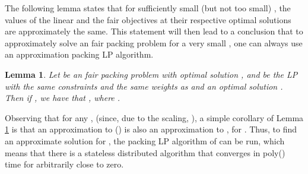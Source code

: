 \documentclass[11pt]{article}
\newtheorem{lemma}[theorem]{Lemma}
\newif\iffullpaper
\begin{document}
The following lemma states that for sufficiently small (but not too small) , the values of the linear and the fair objectives at their respective optimal solutions are approximately the same. This statement will then lead to a conclusion that to approximately solve an fair packing problem for a very small , one can always use an approximation packing LP algorithm. 
\begin{lemma}\label{lemma:LP-close-to-small-alpha-fair}
Let  be an fair packing problem with optimal solution , and  be the LP with the same constraints and the same weights  as  and an optimal solution . Then if , we have that , where .
\end{lemma}
\iffullpaper
\begin{proof}
The proof outline is as follows. First, we show that the fair objective  can be upper-bounded by a linear objective as . Then, to complete the proof, we use the optimality of  for the LP:  ( from the first part of the proof).

Let . Consider the case when . Solving  for , we get that it should be 


Choose  so that , which is equivalent to . Then to have , it suffices to have , because (i)  for , where  is the base of the natural logarithm, and (ii)  by the choice of .

Now, as , summing over  such that  we have:

Now we bound the rest of the terms in , i.e., we consider . Observe that since  for  is a feasible solution to  and  is the optimal solution to , we have that , which gives:

Therefore:

Combining (\ref{eq:large-coord-approx}) and (\ref{eq:small-coord-approx}), we now get:

Finally, since  optimally solves  (which has the same constraints and weights as ), we have that  is feasible for , and using (\ref{eq:alpha-LP}) and optimality of , it follows that:

as claimed.
\end{proof}
\fi
Observing that for any ,  (since, due to the scaling, ), a simple corollary of Lemma \ref{lemma:LP-close-to-small-alpha-fair} is that an approximation  to  () is also an approximation to , for . Thus, to find an approximate solution for , the packing LP algorithm of \cite{AwerbuchKhandekar2009} can be run, which means that there is a stateless distributed algorithm that converges in poly() time for  arbitrarily close to zero.
\end{document}
